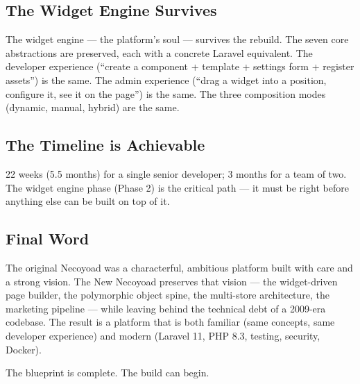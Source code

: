 \documentclass[11pt,a4paper]{article}
\begin{document}
\subsection{The Widget Engine Survives}

The widget engine --- the platform's soul --- survives the rebuild.
The seven core abstractions are preserved, each with a concrete
Laravel equivalent. The developer experience (``create a component +
template + settings form + register assets'') is the same. The admin
experience (``drag a widget into a position, configure it, see it on
the page'') is the same. The three composition modes (dynamic,
manual, hybrid) are the same.

\subsection{The Timeline is Achievable}

22 weeks (5.5 months) for a single senior developer; 3 months for a
team of two. The widget engine phase (Phase 2) is the critical path
--- it must be right before anything else can be built on top of it.

\subsection{Final Word}

The original Necoyoad was a characterful, ambitious platform built
with care and a strong vision. The New Necoyoad preserves that
vision --- the widget-driven page builder, the polymorphic object
spine, the multi-store architecture, the marketing pipeline ---
while leaving behind the technical debt of a 2009-era codebase. The
result is a platform that is both familiar (same concepts, same
developer experience) and modern (Laravel 11, PHP 8.3, testing,
security, Docker).

The blueprint is complete. The build can begin.
\end{document}
